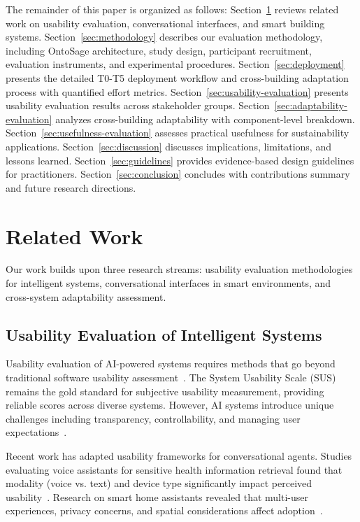 \documentclass[acmlarge]{acmart}
\begin{document}
The remainder of this paper is organized as follows: Section~\ref{sec:related-work} reviews related work on usability evaluation, conversational interfaces, and smart building systems. Section~\ref{sec:methodology} describes our evaluation methodology, including OntoSage architecture, study design, participant recruitment, evaluation instruments, and experimental procedures. Section~\ref{sec:deployment} presents the detailed T0-T5 deployment workflow and cross-building adaptation process with quantified effort metrics. Section~\ref{sec:usability-evaluation} presents usability evaluation results across stakeholder groups. Section~\ref{sec:adaptability-evaluation} analyzes cross-building adaptability with component-level breakdown. Section~\ref{sec:usefulness-evaluation} assesses practical usefulness for sustainability applications. Section~\ref{sec:discussion} discusses implications, limitations, and lessons learned. Section~\ref{sec:guidelines} provides evidence-based design guidelines for practitioners. Section~\ref{sec:conclusion} concludes with contributions summary and future research directions.

\section{Related Work}
\label{sec:related-work}

Our work builds upon three research streams: usability evaluation methodologies for intelligent systems, conversational interfaces in smart environments, and cross-system adaptability assessment.


\subsection{Usability Evaluation of Intelligent Systems}

Usability evaluation of AI-powered systems requires methods that go beyond traditional software usability assessment~\cite{10.1145/3290605.3300488}. The System Usability Scale (SUS)~\cite{Brooke1996} remains the gold standard for subjective usability measurement, providing reliable scores across diverse systems. However, AI systems introduce unique challenges including transparency, controllability, and managing user expectations~\cite{10.1145/3202185.3202744}.

Recent work has adapted usability frameworks for conversational agents. Studies evaluating voice assistants for sensitive health information retrieval found that modality (voice vs. text) and device type significantly impact perceived usability~\cite{10.1145/3290605.3300488}. Research on smart home assistants revealed that multi-user experiences, privacy concerns, and spatial considerations affect adoption~\cite{10.1145/3411764.3445598,10.1145/3279963.3281658}.
\end{document}
